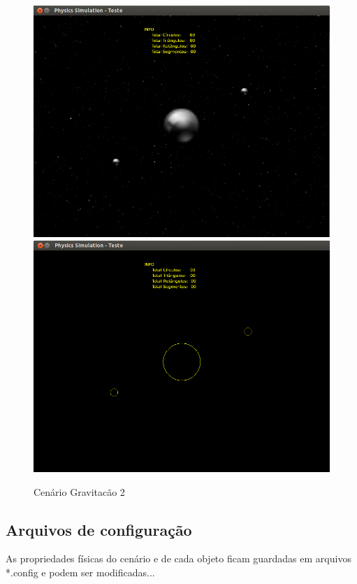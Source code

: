   \begin{figure}[H]
	\centering
    \includegraphics[scale=0.4]{images/cenario-gravitacao-4.png}
    \includegraphics[scale=0.4]{images/cenario-gravitacao-3.png}
	\caption{Cenário Gravitacão 2}
  \end{figure}

\subsection{Arquivos de configuração}
As propriedades físicas do cenário e de cada objeto ficam guardadas em arquivos *.config e podem ser modificadas...

